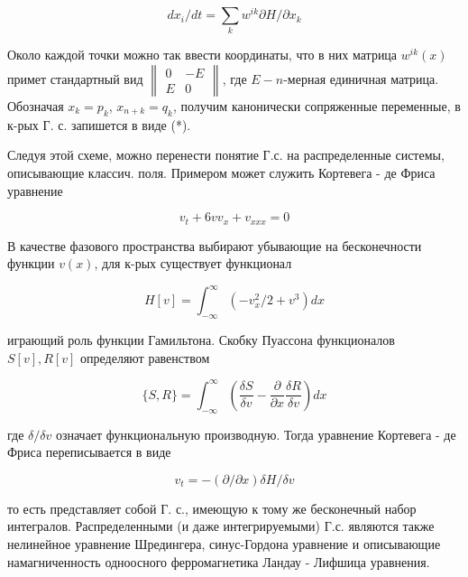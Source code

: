 \documentclass[10pt]{article}
\begin{document}
\[

d x_{i} / d t=\sum_{k} w^{i k} \partial H / \partial x_{k}

\]



Около каждой точки можно так ввести координаты, что в них матрица $w^{i k}(x)$ примет стандартный вид $\left\|\begin{array}{cc}0 & -E \\ E & 0\end{array}\right\|$, где $E-n$-мерная единичная матрица. Обозначая $x_{k}=p_{k}$, $x_{n+k}=q_{k}$, получим канонически сопряженные переменные, в к-рых Г. с. запишется в виде (*).



Следуя этой схеме, можно перенести понятие Г.с. на распределенные системы, описывающие классич. поля. Примером может служить Кортевега - де Фриса уравнение



\[

v_{t}+6 v v_{x}+v_{x x x}=0

\]



В качестве фазового пространства выбирают убывающие на бесконечности функции $v(x)$, для к-рых существует функционал



\[

H[v]=\int_{-\infty}^{\infty}\left(-v_{x}^{2} / 2+v^{3}\right) d x

\]



играющий роль функции Гамильтона. Скобку Пуассона функционалов $S[v], R[v]$ определяют равенством



\[

\{S, R\}=\int_{-\infty}^{\infty}\left(\frac{\delta S}{\delta v}-\frac{\partial}{\partial x} \frac{\delta R}{\delta v}\right) d x

\]



где $\delta / \delta v$ означает функциональную производную. Тогда уравнение Кортевега - де Фриса переписывается в виде



\[

v_{t}=-(\partial / \partial x) \delta H / \delta v

\]



то есть представляет собой Г. с., имеющую к тому же бесконечный набор интегралов. Распределенными (и даже интегрируемыми) Г.с. являются также нелинейное уравнение Шредингера, синус-Гордона уравнение и описывающие намагниченность одноосного ферромагнетика Ландау - Лифшица уравнения.
\end{document}
